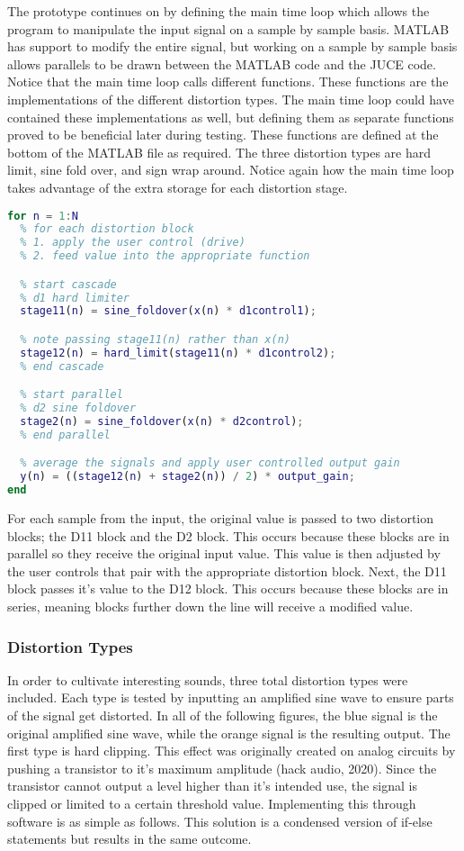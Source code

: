 \documentclass{article}
\begin{document}
The prototype continues on by defining the main time loop which allows the program to
manipulate the input signal on a sample by sample basis. MATLAB has support to
modify the entire signal, but working on a sample by sample basis allows parallels
to be drawn between the MATLAB code and the JUCE code. Notice that the main time loop
calls different functions. These functions are the implementations of the different distortion
types. The main time loop could have contained these implementations as well, but defining them
as separate functions proved to be beneficial later during testing. These functions are defined
at the bottom of the MATLAB file as required. The three distortion types are hard limit, sine fold over,
and sign wrap around. Notice again how the main time loop takes advantage of the extra
storage for each distortion stage.
\begin{lstlisting}[language=MATLAB]
% main time loop
for n = 1:N
  % for each distortion block
  % 1. apply the user control (drive)
  % 2. feed value into the appropriate function

  % start cascade
  % d1 hard limiter
  stage11(n) = sine_foldover(x(n) * d1control1);

  % note passing stage11(n) rather than x(n)
  stage12(n) = hard_limit(stage11(n) * d1control2);
  % end cascade

  % start parallel
  % d2 sine foldover
  stage2(n) = sine_foldover(x(n) * d2control);
  % end parallel

  % average the signals and apply user controlled output gain
  y(n) = ((stage12(n) + stage2(n)) / 2) * output_gain;
end
\end{lstlisting}

For each sample from the input, the original value is passed to two distortion blocks;
the D11 block and the D2 block. This occurs because these blocks are in parallel so they
receive the original input value. This value is then adjusted by the user controls that pair with
the appropriate distortion block. Next, the D11 block passes it's value to the D12 block. This occurs
because these blocks are in series, meaning blocks further down the line will receive a modified
value.
\pagebreak
\subsubsection{Distortion Types}
In order to cultivate interesting sounds, three total distortion types were included. Each type
is tested by inputting an amplified sine wave to ensure parts of the signal get distorted. In all
of the following figures, the blue signal is the original amplified sine wave, while the orange signal
is the resulting output.
The first type is hard clipping. This effect was originally created on analog circuits by pushing
a transistor to it's maximum amplitude (hack audio, 2020). Since the transistor cannot output a level higher than
it's intended use, the signal is clipped or limited to a certain threshold value.
Implementing this through software is as simple as follows. This solution is a condensed
version of if-else statements but results in the same outcome.
\end{document}
